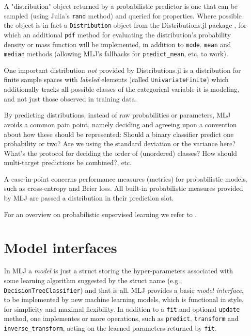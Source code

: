 \documentclass{article}
\begin{document}
A "distribution" object returned by a probabilistic predictor is one
that can be sampled (using Julia's \texttt{rand} method) and queried
for properties. Where possible the object is in fact a
\texttt{Distribution} object from the Distributions.jl package
\cite{LinEtal2020}, for which an additional \texttt{pdf} method for
evaluating the distribution's probability density or mass function
will be implemented, in addition to \texttt{mode}, \texttt{mean}
and \texttt{median} methods (allowing MLJ's fallbacks for
\texttt{predict\_mean}, etc, to work).

One important distribution \textit{not} provided by Distributions.jl
is a distribution for finite sample spaces with {\em labeled} elements
(called \texttt{UnivariateFinite}) which additionally tracks all
possible classes of the categorical variable it is modeling, and not
just those observed in training data.

By predicting distributions, instead of raw probabilities or
parameters, MLJ avoids a common pain point, namely deciding and
agreeing upon a convention about how these should be represented:
Should a binary classifier predict one probability or two? Are we
using the standard deviation or the variance here? What's the protocol
for deciding the order of (unordered) classes? How should multi-target
predictions be combined?, etc.

A case-in-point concerns performance measures (metrics) for
probabilistic models, such as cross-entropy and Brier loss. All
built-in probabilistic measures provided by MLJ are passed a
distribution in their prediction slot.

For an overview on probabilistic supervised learning we refer to
\cite{Gressmann2018}.

\section{Model interfaces}

In MLJ a \textit{model} is just a struct storing the hyper-parameters
associated with some learning algorithm suggested by the struct name
(e.g., \texttt{DecisionTreeClassifier}) and that is all.  MLJ provides
a basic \textit{model interface}, to be implemented by new machine
learning models, which is functional in style, for simplicity and
maximal flexibility. In addition to a \texttt{fit} and optional
\texttt{update} method, one implementes or more operations, such as
\texttt{predict}, \texttt{transform} and \texttt{inverse\_transform},
acting on the learned parameters returned by \texttt{fit}.
\end{document}
